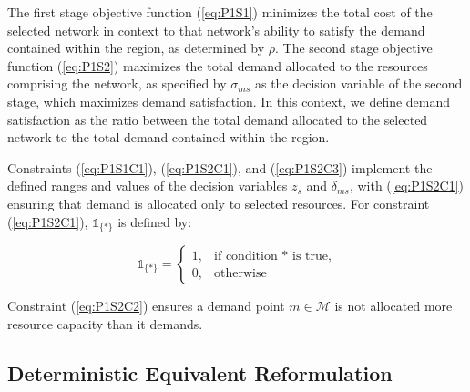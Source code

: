 \documentclass[onecolumn,draftcls]{IEEEtran}
\begin{document}
The first stage objective function (\ref{eq:P1S1}) minimizes the total cost of the selected network in context to that network's ability to satisfy the demand contained within the region, as determined by $\rho$.  The second stage objective function (\ref{eq:P1S2}) maximizes the total demand allocated to the resources comprising the network, as specified by $\sigma_{ms}$ as the decision variable of the second stage, which maximizes demand satisfaction.  In this context, we define demand satisfaction as the ratio between the total demand allocated to the selected network to the total demand contained within the region.

Constraints (\ref{eq:P1S1C1}), (\ref{eq:P1S2C1}), and (\ref{eq:P1S2C3}) implement the defined ranges and values of the decision variables $z_s$ and $\delta_{ms}$, with (\ref{eq:P1S2C1}) ensuring that demand is allocated only to selected resources.  For constraint (\ref{eq:P1S2C1}), $\mathbb{1}_{\{*\}}$ is defined by:

\[ \mathbb{1}_{\{*\}} =
	\begin{cases}
		1,& \text{if condition $*$ is true,}\\
		0,& \text{otherwise}
	\end{cases}
\]

Constraint (\ref{eq:P1S2C2}) ensures a demand point $m \in \mathcal{M}$ is not allocated more resource capacity than it demands.



\subsection{Deterministic Equivalent Reformulation}
\end{document}
